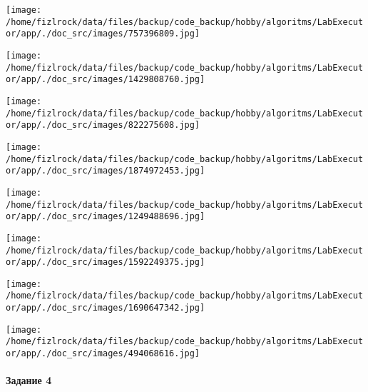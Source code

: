 \documentclass[a4paper, 12pt]{article}
\begin{document}
\texttt{[image: /home/fizlrock/data/files/backup/code\_backup/hobby/algoritms/LabExecutor/app/./doc\_src/images/757396809.jpg]}

\texttt{[image: /home/fizlrock/data/files/backup/code\_backup/hobby/algoritms/LabExecutor/app/./doc\_src/images/1429808760.jpg]}

\texttt{[image: /home/fizlrock/data/files/backup/code\_backup/hobby/algoritms/LabExecutor/app/./doc\_src/images/822275608.jpg]}

\texttt{[image: /home/fizlrock/data/files/backup/code\_backup/hobby/algoritms/LabExecutor/app/./doc\_src/images/1874972453.jpg]}

\texttt{[image: /home/fizlrock/data/files/backup/code\_backup/hobby/algoritms/LabExecutor/app/./doc\_src/images/1249488696.jpg]}

\texttt{[image: /home/fizlrock/data/files/backup/code\_backup/hobby/algoritms/LabExecutor/app/./doc\_src/images/1592249375.jpg]}

\texttt{[image: /home/fizlrock/data/files/backup/code\_backup/hobby/algoritms/LabExecutor/app/./doc\_src/images/1690647342.jpg]}

\texttt{[image: /home/fizlrock/data/files/backup/code\_backup/hobby/algoritms/LabExecutor/app/./doc\_src/images/494068616.jpg]}
\pagebreak
\paragraph{Задание 4}
\end{document}
